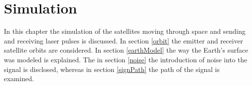 \chapter{Simulation}
\label{simulation}
In this chapter the simulation of the satellites moving through space and sending and receiving laser pulses is discussed. In section \ref{orbit} the emitter and receiver satellite orbits are considered. In section \ref{earthModel} the way the Earth's surface was modeled is explained. The in section \ref{noise} the introduction of noise into the signal is disclosed, whereas in section \ref{signPath} the path of the signal is examined.